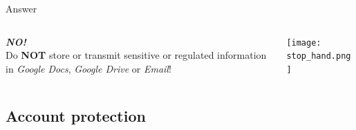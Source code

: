 \begin{frame}
{\begin{block}{Answer}
\begin{columns}
\begin{column}{0.70\textwidth}
    \centering
    {\HUGE \textbf{\textit{NO!}}}\Large~\\Do \textbf{NOT} store or transmit sensitive or regulated information in \emph{Google Docs}, \emph{Google Drive} or \emph{Email}!
\end{column}
\begin{column}{0.15\textwidth}\texttt{[image: stop\_hand.png]}\end{column}
\end{columns}
    \end{block}}
\end{frame}



\subsection{Account protection}
